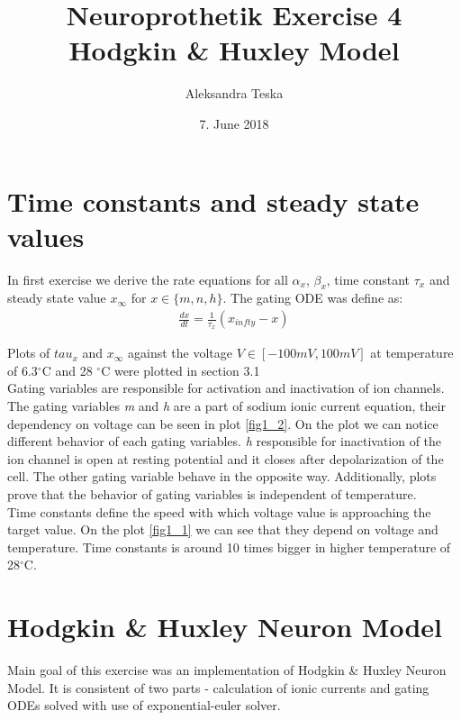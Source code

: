 \documentclass{scrartcl}			%
\title{Neuroprothetik Exercise 4 \\\textsl{}
	Hodgkin \& Huxley Model}
\author{Aleksandra Teska}
\date{7. June 2018}
\begin{document}

\maketitle
\section{Time constants and steady state values}		%
In first exercise we derive the rate equations for all $\alpha_{x}$, $\beta_{x}$, time constant ${\tau_x}$ and steady state value $x_{\infty}$ for $x\in\{m, n, h\}$. The gating ODE was define as:
\begin{align}
\frac{dx}{dt} = \frac{1}{\tau_x} (x_{infty} - x)
\end{align}			

Plots of $tau_x$ and $x_{\infty}$ against the voltage $V \in [-100 mV, 100 mV]$ at temperature of 6.3$^{\circ}$C and 28 $^{\circ}$C were plotted in section 3.1 \\


Gating variables are responsible for activation and inactivation of ion channels. The gating variables \textit{m} and \textit{h} are a part of sodium ionic current equation, their dependency on voltage can be seen in plot \ref{fig1_2}. On the plot we can notice different behavior of each gating variables. \textit{h} responsible for inactivation of the ion channel is open at resting potential and it closes after depolarization of the cell. The other gating variable behave in the opposite way. Additionally, plots prove that the behavior of gating variables is independent of temperature.\\

Time constants define the speed with which voltage value is approaching the target value. On the plot \ref{fig1_1} we can see that they depend on voltage and temperature. Time constants is around 10 times bigger in higher temperature of 28$^{\circ}$C.


\section{Hodgkin \& Huxley Neuron Model}		%
Main goal of this exercise was an implementation of Hodgkin \& Huxley Neuron Model. It is consistent of two parts - calculation of ionic currents and gating ODEs solved with use of exponential-euler solver.
\end{document}
